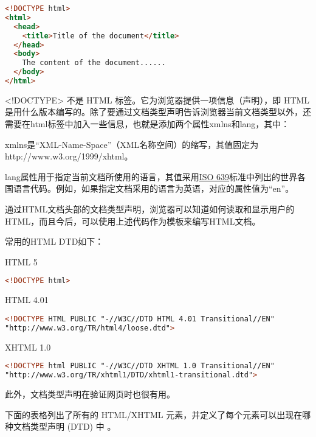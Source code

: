 \begin{lstlisting}[language=HTML]
<!DOCTYPE html>
<html>
  <head>
    <title>Title of the document</title>
  </head>
  <body>
    The content of the document......
  </body>
</html>
\end{lstlisting}


<!DOCTYPE> 不是 HTML 标签。它为浏览器提供一项信息（声明），即 HTML 是用什么版本编写的。除了要通过文档类型声明告诉浏览器当前文档类型以外，还需要在html标签中加入一些信息，也就是添加两个属性xmlns和lang，其中：

\begin{compactitem}
\item xmlns是“XML-Name-Space”（XML名称空间）的缩写，其值固定为http://www.w3.org/1999/xhtml。
\item lang属性用于指定当前文档所使用的语言，其值采用\href{http://www.w3.org/WAI/ER/IG/ert/iso639.htm#2letter}{ISO 639}标准中列出的世界各国语言代码。例如，如果指定文档采用的语言为英语，对应的属性值为“en”。
\end{compactitem}

通过HTML文档头部的文档类型声明，浏览器可以知道如何读取和显示用户的HTML，而且今后，可以使用上述代码作为模板来编写HTML文档。

常用的HTML DTD如下：

\begin{compactitem}
\item HTML 5
\begin{lstlisting}[language=HTML]
<!DOCTYPE html>
\end{lstlisting}

\item HTML 4.01
\begin{lstlisting}[language=HTML]
<!DOCTYPE HTML PUBLIC "-//W3C//DTD HTML 4.01 Transitional//EN"
"http://www.w3.org/TR/html4/loose.dtd">
\end{lstlisting}

\item XHTML 1.0
\begin{lstlisting}[language=HTML]
<!DOCTYPE html PUBLIC "-//W3C//DTD XHTML 1.0 Transitional//EN"
"http://www.w3.org/TR/xhtml1/DTD/xhtml1-transitional.dtd">
\end{lstlisting}

\end{compactitem}

此外，文档类型声明在验证网页时也很有用。


下面的表格列出了所有的 HTML/XHTML 元素，并定义了每个元素可以出现在哪种文档类型声明 (DTD) 中 。


